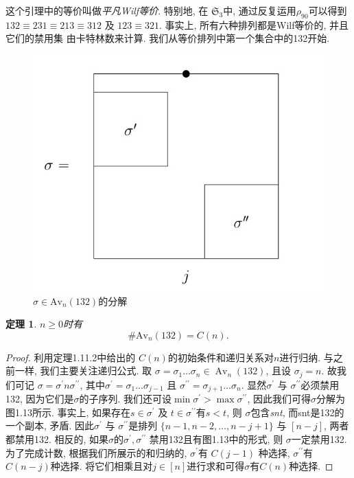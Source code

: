 \documentclass{ctexbook}
\newtheorem{thm}{定理}[section]
\begin{document}
这个引理中的等价叫做\textsl{平凡Wilf等价}. 特别地, 在 $\mathfrak{S}_{3}$中, 通过反复运用$\rho_{90}$可以得到
$132 \equiv 231 \equiv 213 \equiv 312$ 及 $123 \equiv 321$. 事实上, 所有六种排列都是Wilf等价的, 并且它们的禁用集
由卡特林数来计算. 我们从等价排列中第一个集合中的132开始.


\begin{figure}
    \centering
   \includegraphics[scale=0.3]{./fig1/figure1.13.PNG}
    \caption{$\sigma \in \mathrm{Av}_{n}(132)$的分解}
\end{figure}
      \begin{thm}
     	$n \geqslant 0$时有
     	$$
     	\# \mathrm{Av}_{n}(132)=C(n).
     	$$
     \end{thm}
     \begin{proof}
     	利用定理1.11.2中给出的 $C(n)$的初始条件和递归关系对$n$进行归纳. 与之前一样, 我们主要关注递归公式. 取
     	$\sigma=\sigma_{1} \ldots \sigma_{n} \in \operatorname{Av}_{n}(132)$, 且设 $\sigma_{j}=n$. 故我们可记 $\sigma=\sigma^{\prime} n \sigma^{\prime \prime}$,
     	其中$\sigma^{\prime}=\sigma_{1} \ldots \sigma_{j-1}$ 且 $\sigma^{\prime \prime}=\sigma_{j+1} \ldots \sigma_{n}$.
     	显然$\sigma^{\prime}$ 与 $\sigma^{\prime \prime}$必须禁用132, 因为它们是$\sigma$的子序列. 我们还可设$\min \sigma^{\prime}>\max \sigma^{\prime \prime}$,
     	因此我们可得$\sigma$分解为图1.13所示. 事实上, 如果存在$s \in \sigma^{\prime}$ 及 $t \in \sigma^{\prime \prime}$有$s<t$, 则
     	$\sigma$包含\textsl{snt}, 而snt是132的一个副本, 矛盾. 因此$\sigma^{\prime}$ 与 $\sigma^{\prime \prime}$是排列
     	$\{n-1, n-2, \ldots, n-j+1\}$ 与 $[n-j]$, 两者都禁用132. 相反的, 如果$\sigma$的$\sigma^{\prime}, \sigma^{\prime \prime}$
     	禁用132且有图1.13中的形式, 则 $\sigma$一定禁用132. 为了完成计数, 根据我们所展示的和归纳的, $\sigma^{\prime}$有
     	$C(j-1)$ 种选择, $\sigma^{\prime \prime} $有$C(n-j)$种选择. 将它们相乘且对$j \in[n]$进行求和可得$\sigma$有$C(n)$种选择.
     \end{proof}
\end{document}

